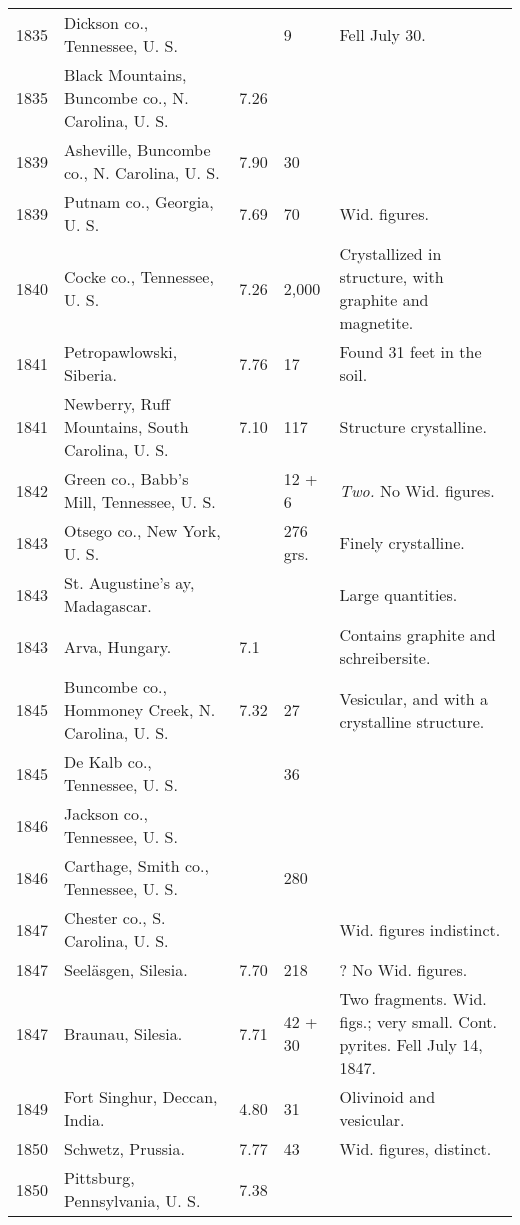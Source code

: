 \documentclass[a4paper, 12pt, oneside]{article}
\begin{document}
\begin{center}
\begin{longtable}{|p{16mm}|p{34mm}|p{10mm}|p{12mm}|p{40mm}|}
        1835 & Dickson co., Tennessee, U. S. & ~ & 9 & Fell July 30. \\
        1835 & Black Mountains, Buncombe co., N. Carolina, U. S. & 7.26 & ~ & ~ \\
        1839 & Asheville, Buncombe co., N. Carolina, U. S. & 7.90 & 30 & ~ \\
        1839 & Putnam co., Georgia, U. S. & 7.69 & 70 & Wid. figures. \\
        1840 & Cocke co., Tennessee, U. S. & 7.26 & 2,000 & Crystallized in structure, with graphite and magnetite. \\
        1841 & Petropawlowski, Siberia. & 7.76 & 17 & Found 31 feet in the soil. \\
        1841 & Newberry, Ruff Mountains, South Carolina, U. S. & 7.10 & 117 & Structure crystalline. \\
        1842 & Green co., Babb’s Mill, Tennessee, U. S. & ~ & 12 + 6 & \emph{Two.} No Wid. figures. \\
        1843 & Otsego co., New York, U. S. & ~ & 276 grs. & Finely crystalline. \\
        1843 & St. Augustine’s ay, Madagascar. & ~ & ~ & Large quantities. \\
        1843 & Arva, Hungary. & 7.1 & ~ & Contains graphite and schreibersite. \\
        1845 & Buncombe co., Hommoney Creek, N. Carolina, U. S. & 7.32 & 27 & Vesicular, and with a crystalline structure. \\
        1845 & De Kalb co., Tennessee, U. S. & ~ & 36 & ~ \\
        1846 & Jackson co., Tennessee, U. S. & ~ & ~ & ~ \\
        1846 & Carthage, Smith co., Tennessee, U. S. & ~ & 280 & ~ \\
        1847 & Chester co., S. Carolina, U. S. & ~ & ~ & Wid. figures indistinct. \\
        1847 & Seeläsgen, Silesia. & 7.70 & 218 & ? No Wid. figures. \\
        1847 & Braunau, Silesia. & 7.71 & 42 + 30 & Two fragments. Wid. figs.; very small. Cont. pyrites. Fell July 14, 1847. \\
        1849 & Fort Singhur, Deccan, India. & 4.80 & 31 & Olivinoid and vesicular. \\
        1850 & Schwetz, Prussia. & 7.77 & 43 & Wid. figures, distinct. \\
        1850 & Pittsburg, Pennsylvania, U. S. & 7.38 & ~ & ~ \\

\end{longtable}
\end{center}
\end{document}

